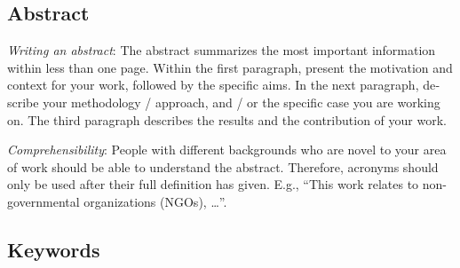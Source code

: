 \cleardoublepage
{}

\begin{otherlanguage}{english}
\chapter*{Abstract}

\emph{Writing an abstract}:
The abstract summarizes the most important information within less than one page. Within the first paragraph, present the motivation and context for your work, followed by the specific aims. In the next paragraph, describe your methodology / approach, and / or the specific case you are working on. The third paragraph describes the results and the contribution of your work.

\emph{Comprehensibility}:
People with different backgrounds who are novel to your area of work should be able to understand the abstract. Therefore, acronyms should only be used after their full definition has given. E.g., ``This work relates to non-governmental organizations (NGOs), \ldots''.

\bigskip

\section*{Keywords}

\end{otherlanguage}
